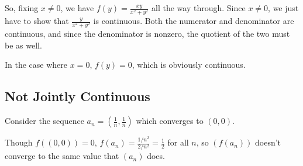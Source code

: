 \documentclass[12pt]{article}
\begin{document}
So, fixing $x \ne 0$, we have $f(y)=\frac{xy}{x^2+y^2}$ all the way through.
Since $x \ne 0$, we just have to show that $\frac{y}{x^2+y^2}$ is continuous.
Both the numerator and denominator are continuous, and since the denominator
is nonzero, the quotient of the two must be as well.

In the case where $x=0$, $f(y)=0$, which is obviously continuous.

\subsection{Not Jointly Continuous}

Consider the sequence $a_n = \left(\frac{1}{n}, \frac{1}{n}\right)$ which converges to $(0, 0)$.

Though $f((0, 0)) = 0$, $f(a_n)=\frac{1/n^2}{2/n^2}=\frac{1}{2}$ for all $n$,
so $(f(a_n))$ doesn't converge to the same value that $(a_n)$ does.
\end{document}
